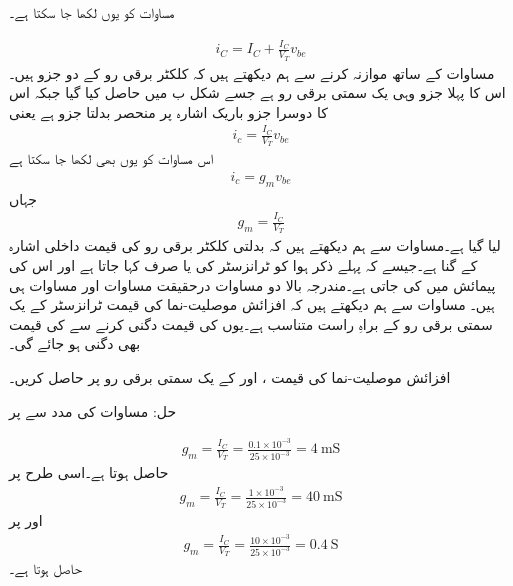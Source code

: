 



	مساوات   کو یوں لکھا جا سکتا ہے۔

\begin{align} \label{مساوات_ٹرانزسٹر_رو_کے_یکسمتی_اور_بدلتا_حصوں_کا_حصول}
i_C=I_C+\frac{I_C}{V_T} v_{be}
\end{align}
مساوات   کے ساتھ موازنہ کرنے سے ہم دیکھتے ہیں کہ کلکٹر  برقی رو   کے دو جزو ہیں۔اس کا پہلا جزو وہی یک سمتی برقی رو  ہے جسے شکل   ب میں حاصل کیا گیا جبکہ اس کا دوسرا جزو    باریک اشارہ پر منحصر بدلتا جزو ہے یعنی
\begin{align} \label{مساوات_ٹرانزسٹر_رو_کے_بدلتے_حصے_کا_حصول}
i_c = \frac{I_C}{V_T} v_{be}
\end{align}
اس مساوات کو یوں بھی لکھا جا سکتا ہے
\begin{align} \label{مساوات_ٹرانزسٹر_اشارے_میں_اضافہ}
i_c = g_m v_{be}
\end{align}
جہاں
\begin{align} \label{مساوات_ٹرانزسٹر_افزائش_موصلیت_نما}
g_m =\frac{I_C}{V_T}
\end{align}
لیا گیا ہے۔مساوات   سے ہم دیکھتے ہیں کہ بدلتی کلکٹر  برقی رو   کی قیمت داخلی اشارہ  کے   گنا ہے۔جیسے کہ پہلے ذکر ہوا  کو ٹرانزسٹر کی   یا صرف   کہا جاتا ہے اور اس کی پیمائش   میں کی جاتی ہے۔مندرجہ بالا دو مساوات درحقیقت مساوات   اور مساوات    ہی ہیں۔
	مساوات   سے ہم دیکھتے ہیں کہ افزائش موصلیت-نما کی قیمت ٹرانزسٹر کے یک سمتی برقی رو  کے براہِ راست متناسب ہے۔یوں  کی قیمت دگنی کرنے سے  کی قیمت بھی دگنی ہو جائے گی۔

افزائش موصلیت-نما کی قیمت ،  اور  کے یک سمتی برقی رو پر حاصل کریں۔

حل:	مساوات   کی مدد سے  پر

\begin{align*}
g_m = \frac{I_C}{V_T}=\frac{0.1 \times 10^{-3}}{25 \times 10^{-3}}=\SI{4}{\milli \siemens}
\end{align*}
حاصل ہوتا ہے۔اسی طرح   پر
\begin{align*}
g_m = \frac{I_C}{V_T}=\frac{1 \times 10^{-3}}{25 \times 10^{-3}}=\SI{40}{\milli \siemens}
\end{align*}
اور   پر
\begin{align*}
g_m = \frac{I_C}{V_T}=\frac{10 \times 10^{-3}}{25 \times 10^{-3}}=\SI{0.4}{\siemens}
\end{align*}
حاصل ہوتا ہے۔

